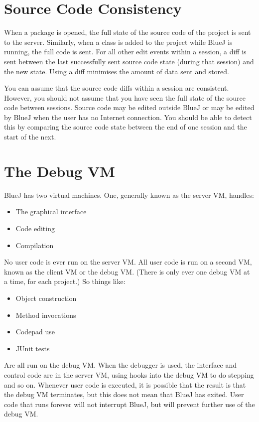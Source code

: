 \documentclass{report}
\begin{document}
\section{Source Code Consistency}

When a package is opened, the full state of the source code of the project is
sent to the server.  Similarly, when a class is added to the project while
BlueJ is running, the full code is sent.  For all other edit events within a session, a diff is sent
between the last successfully sent source code state (during that session) and
the new state.  Using a diff minimises the amount of data sent and stored.

You can assume that the source code diffs within a session are consistent.
However, you should not assume that you have seen the full state of the source
code between sessions.  Source code may be edited outside BlueJ or may be edited
by BlueJ when the user has no Internet connection.  You should be able to
detect this by comparing the source code state between the end of one session
and the start of the next.

\section{The Debug VM}

BlueJ has two virtual machines.  One, generally known as the server VM,
handles:

\begin{itemize}
\item The graphical interface
\item Code editing
\item Compilation
\end{itemize}

No user code is ever run on the server VM.  All user code is run on a second
VM, known as the client VM or the debug VM.  (There is only ever one debug VM
at a time, for each project.)  So things like:

\begin{itemize}
\item Object construction
\item Method invocations
\item Codepad use
\item JUnit tests
\end{itemize}

Are all run on the debug VM.  When the debugger is used, the interface and
control code are in the server VM, using hooks into the debug VM to do
stepping and so on.  Whenever user code is executed, it is possible that the
result is that the debug VM terminates, but this does not mean that BlueJ has
exited.  User code that runs forever will not interrupt BlueJ, but will
prevent further use of the debug VM.
\end{document}
